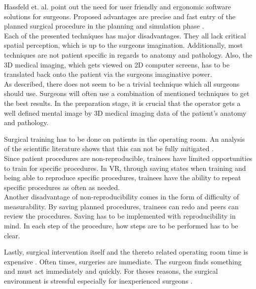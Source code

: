 Hassfeld et. al. point out the need for user friendly and ergonomic software solutions for surgeons.
Proposed advantages are precise and fast entry of the planned surgical procedure in the planning and simulation phase \cite{HASSFELD20012}.
\\ Each of the presented techniques has major disadvantages.
They all lack critical spatial perception, which is up to the surgeons imagination.
Additionally, most techniques are not patient specific in regards to anatomy and pathology.
Also, the 3D medical imaging, which gets viewed on 2D computer screens, has to be translated back onto the patient via the surgeons imaginative power.
\\ As described, there does not seem to be a trivial technique which all surgeons should use.
Surgeons will often use a combination of mentioned techniques to get the best results.
In the preparation stage, it is crucial that the operator gets a well defined mental image by 3D medical imaging data of the patient's anatomy and pathology.

Surgical training has to be done on patients in the operating room.
An analysis of the scientific literature shows that this can not be fully mitigated \cite{mcgaghie2011does}.
\\ Since patient procedures are non-reproducible, trainees have limited opportunities to train for specific procedures.
In VR, through saving states when training and being able to reproduce specific procedures, trainees have the ability to repeat specific procedures as often as needed.
\\ Another disadvantage of non-reproducibility comes in the form of difficulty of measurability.
By saving planned procedures, trainees can redo and peers can review the procedures.
Saving has to be implemented with reproducibility in mind.
In each step of the procedure, how steps are to be performed has to be clear.

Lastly, surgical intervention itself and the thereto related operating room time is expensive \cite{Barber.2020}.
Often times, surgeries are immediate.
The surgeon finds something and must act immediately and quickly.
For theses reasons, the surgical environment is stressful especially for inexperienced surgeons \cite{schuetz2008three}.